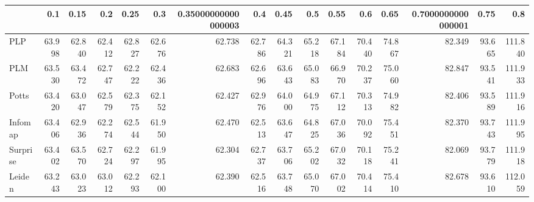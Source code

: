 \begin{tabular}{lrrrrrrrrrrrrrrr}
\toprule
{} &    0.1 &   0.15 &    0.2 &   0.25 &    0.3 & 0.35000000000000003 &    0.4 &   0.45 &    0.5 &   0.55 &    0.6 &   0.65 & 0.7000000000000001 &   0.75 &     0.8 \\
\midrule
PLP      & 63.998 & 62.840 & 62.412 & 62.827 & 62.676 &              62.738 & 62.786 & 64.321 & 65.218 & 67.184 & 70.440 & 74.867 &             82.349 & 93.665 & 111.840 \\
PLM      & 63.530 & 63.472 & 62.747 & 62.222 & 62.436 &              62.683 & 62.696 & 63.643 & 65.083 & 66.970 & 70.237 & 75.060 &             82.847 & 93.541 & 111.933 \\
Potts    & 63.420 & 63.047 & 62.579 & 62.375 & 62.152 &              62.427 & 62.976 & 64.000 & 64.975 & 67.112 & 70.313 & 74.982 &             82.406 & 93.589 & 111.916 \\
Infomap  & 63.406 & 62.936 & 62.274 & 62.544 & 61.950 &              62.470 & 62.513 & 63.647 & 64.825 & 67.036 & 70.092 & 75.451 &             82.370 & 93.743 & 111.995 \\
Surprise & 63.402 & 63.570 & 62.724 & 62.297 & 61.995 &              62.304 & 62.737 & 63.706 & 65.202 & 67.032 & 70.118 & 75.241 &             82.069 & 93.779 & 111.918 \\
Leiden   & 63.243 & 63.023 & 63.012 & 62.293 & 62.100 &              62.390 & 62.516 & 63.748 & 65.070 & 67.002 & 70.414 & 75.410 &             82.678 & 93.610 & 112.059 \\
\bottomrule
\end{tabular}
